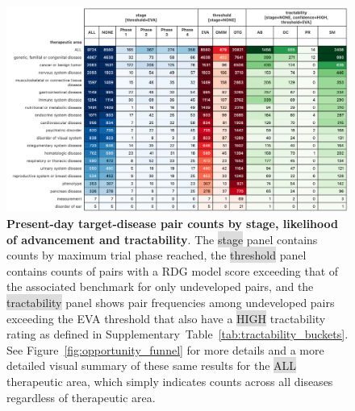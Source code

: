 \documentclass{article}
\begin{document}
\begin{figure}[H]
  \centering
  \captionsetup{width=.9\linewidth}
  \includegraphics[width=1\textwidth]{opportunity_summary.png}
  \caption{
    \textbf{Present-day target-disease pair counts by stage, likelihood of advancement and tractability}. The \colorbox{Gainsboro}{stage} panel contains counts by maximum trial phase reached, the \colorbox{Gainsboro}{threshold} panel contains counts of pairs with a RDG model score exceeding that of the associated benchmark for only undeveloped pairs, and the \colorbox{Gainsboro}{tractability} panel shows pair frequencies among undeveloped pairs exceeding the EVA threshold that also have a \colorbox{Gainsboro}{HIGH} tractability rating as defined in Supplementary~Table~\ref{tab:tractability_buckets}. See Figure~\ref{fig:opportunity_funnel} for more details and a more detailed visual summary of these same results for the \colorbox{Gainsboro}{ALL} therapeutic area, which simply indicates counts across all diseases regardless of therapeutic area.
  }
  \label{fig:opportunity_summary}
\end{figure}

\pagebreak
\end{document}
